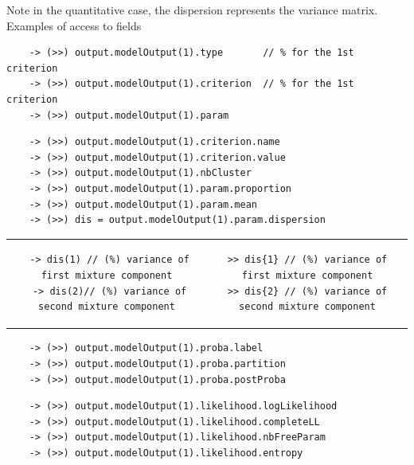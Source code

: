 \begin{itemize}
Note in the quantitative case, the dispersion represents the variance matrix.\\

\vspace*{0.5cm}
{\noindent Examples of access to fields}
{\scriptsize
\begin{verbatim}
    -> (>>) output.modelOutput(1).type       // % for the 1st criterion
    -> (>>) output.modelOutput(1).criterion  // % for the 1st criterion
    -> (>>) output.modelOutput(1).param
\end{verbatim}}


{\scriptsize
\begin{verbatim}
    -> (>>) output.modelOutput(1).criterion.name
    -> (>>) output.modelOutput(1).criterion.value
    -> (>>) output.modelOutput(1).nbCluster
    -> (>>) output.modelOutput(1).param.proportion
    -> (>>) output.modelOutput(1).param.mean
    -> (>>) dis = output.modelOutput(1).param.dispersion
\end{verbatim}}






\begin{tabular}{c|c}
 \begin{minipage}[c]{0.46 \columnwidth} %
  {\scriptsize
    \begin{verbatim}
 -> dis(1) // (%) variance of first mixture component
 -> dis(2)// (%) variance of second mixture component
    \end{verbatim}
 }
    \end{minipage} %
&
\begin{minipage}[c]{0.54 \columnwidth} %
 {\scriptsize
   \begin{verbatim}
>> dis{1} // (%) variance of first mixture component
>> dis{2} // (%) variance of second mixture component
   \end{verbatim}
 }
   \end{minipage} %

\end{tabular}



{\scriptsize
\begin{verbatim}
    -> (>>) output.modelOutput(1).proba.label
    -> (>>) output.modelOutput(1).proba.partition
    -> (>>) output.modelOutput(1).proba.postProba
\end{verbatim}}

{\scriptsize
\begin{verbatim}
    -> (>>) output.modelOutput(1).likelihood.logLikelihood
    -> (>>) output.modelOutput(1).likelihood.completeLL
    -> (>>) output.modelOutput(1).likelihood.nbFreeParam
    -> (>>) output.modelOutput(1).likelihood.entropy
\end{verbatim}}


\end{itemize}


